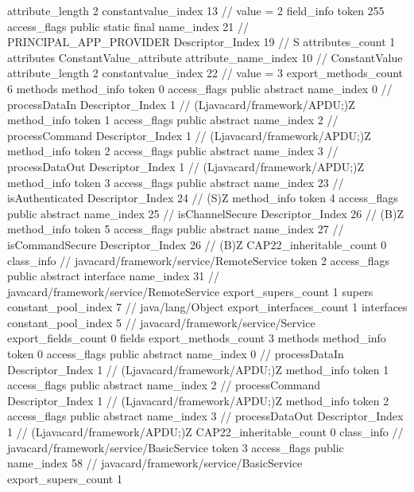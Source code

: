 {{{{{{{					attribute_length	2
					constantvalue_index	13		// value = 2
				}
				}
			}
			field_info {
				token	255
				access_flags	public static final
				name_index	21		// PRINCIPAL_APP_PROVIDER
				Descriptor_Index	19		// S
				attributes_count	1
				attributes {
				ConstantValue_attribute {
					attribute_name_index	10		// ConstantValue
					attribute_length	2
					constantvalue_index	22		// value = 3
				}
				}
			}
			}
			export_methods_count	6
			methods {
				method_info {
					token	0
					access_flags	public abstract
					name_index	0		// processDataIn
					Descriptor_Index	1		// (Ljavacard/framework/APDU;)Z
				}
				method_info {
					token	1
					access_flags	public abstract
					name_index	2		// processCommand
					Descriptor_Index	1		// (Ljavacard/framework/APDU;)Z
				}
				method_info {
					token	2
					access_flags	public abstract
					name_index	3		// processDataOut
					Descriptor_Index	1		// (Ljavacard/framework/APDU;)Z
				}
				method_info {
					token	3
					access_flags	public abstract
					name_index	23		// isAuthenticated
					Descriptor_Index	24		// (S)Z
				}
				method_info {
					token	4
					access_flags	public abstract
					name_index	25		// isChannelSecure
					Descriptor_Index	26		// (B)Z
				}
				method_info {
					token	5
					access_flags	public abstract
					name_index	27		// isCommandSecure
					Descriptor_Index	26		// (B)Z
				}
			}
			CAP22_inheritable_count	0
		}
		class_info {		// javacard/framework/service/RemoteService
			token	2
			access_flags	public abstract interface
			name_index	31		// javacard/framework/service/RemoteService
			export_supers_count	1
			supers {
				constant_pool_index	7		// java/lang/Object
			}
			export_interfaces_count	1
			interfaces {
				constant_pool_index	5		// javacard/framework/service/Service
			}
			export_fields_count	0
			fields {
			}
			export_methods_count	3
			methods {
				method_info {
					token	0
					access_flags	public abstract
					name_index	0		// processDataIn
					Descriptor_Index	1		// (Ljavacard/framework/APDU;)Z
				}
				method_info {
					token	1
					access_flags	public abstract
					name_index	2		// processCommand
					Descriptor_Index	1		// (Ljavacard/framework/APDU;)Z
				}
				method_info {
					token	2
					access_flags	public abstract
					name_index	3		// processDataOut
					Descriptor_Index	1		// (Ljavacard/framework/APDU;)Z
				}
			}
			CAP22_inheritable_count	0
		}
		class_info {		// javacard/framework/service/BasicService
			token	3
			access_flags	public
			name_index	58		// javacard/framework/service/BasicService
			export_supers_count	1
}}}
